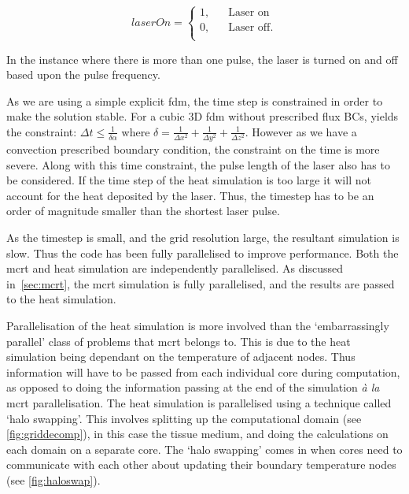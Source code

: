 \[   
laserOn = 
     \begin{cases}
       \text{1,} &\quad\text{Laser on}\\
       \text{0,} &\quad\text{Laser off}.\\
     \end{cases}
\]

In the instance where there is more than one pulse, the laser is turned on and off based upon the pulse frequency.

\medskip

As we are using a simple explicit \gls{fdm}, the time step is constrained in order to make the solution stable. For a cubic 3D \gls{fdm} without prescribed flux BCs, yields the constraint: $\Delta t \leq \tfrac{1}{\delta \alpha}$ where $\delta=\tfrac{1}{\Delta x^2}+\tfrac{1}{\Delta y^2}+\tfrac{1}{\Delta z^2}$. However as we have a convection prescribed boundary condition, the constraint on the time is more severe. Along with this time constraint, the pulse length of the laser also has to be considered. If the time step of the heat simulation is too large it will not account for the heat deposited by the laser. Thus, the timestep has to be an order of magnitude smaller than the shortest laser pulse.

As the timestep is small, and the grid resolution large, the resultant simulation is slow. Thus the code has been fully parallelised to improve performance. Both the \gls{mcrt} and heat simulation are independently parallelised. As discussed in~\cref{sec:mcrt}, the \gls{mcrt} simulation is fully parallelised, and the results are passed to the heat simulation.

\medskip

Parallelisation of the heat simulation is more involved than the `embarrassingly parallel' class of problems that \gls{mcrt} belongs to. This is due to the heat simulation being dependant on the temperature of adjacent nodes. Thus information will have to be passed from each individual core during computation, as opposed to doing the information passing at the end of the simulation \textit{\`a la} \gls{mcrt} parallelisation.
The heat simulation is parallelised using a technique called `halo swapping'. This involves splitting up the computational domain (see \cref{fig:griddecomp}), in this case the tissue medium, and doing the calculations on each domain on a separate core. The `halo swapping' comes in when cores need to communicate with each other about updating their boundary temperature nodes (see \cref{fig:haloswap}).

